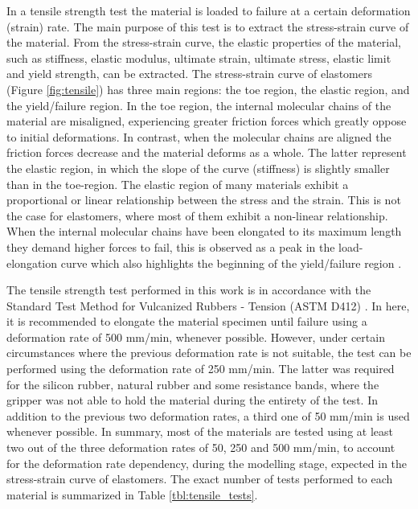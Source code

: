 In a tensile strength test the material is loaded to failure at a certain deformation (strain) rate. The main purpose of this test is to extract the stress-strain curve of the material. From the stress-strain curve, the elastic properties of the material, such as stiffness, elastic modulus, ultimate strain, ultimate stress, elastic limit and yield strength, can be extracted. The stress-strain curve of elastomers (Figure \ref{fig:tensile}) has three main regions: the toe region, the elastic region, and the yield/failure region. In the toe region, the internal molecular chains of the material are misaligned, experiencing greater friction forces which greatly oppose to initial deformations. In contrast, when the molecular chains are aligned the friction forces decrease and the material deforms as a whole. The latter represent the elastic region, in which the slope of the curve (stiffness) is slightly smaller than in the toe-region. The elastic region of many materials exhibit a proportional or linear relationship between the stress and the strain. This is not the case for elastomers, where most of them exhibit a non-linear relationship. When the internal molecular chains have been elongated to its maximum length they demand higher forces to fail, this is observed as a peak in the load-elongation curve which also highlights the beginning of the yield/failure region \cite{Bauman2008}.

The tensile strength test performed in this work is in accordance with the Standard Test Method for Vulcanized Rubbers - Tension (ASTM D412) \cite{astmd412}. In here, it is recommended to elongate the material specimen until failure using a deformation rate of 500 mm/min, whenever possible. However, under certain circumstances where the previous deformation rate is not suitable, the test can be performed using the deformation rate of 250 mm/min. The latter was required for the silicon rubber, natural rubber and some resistance bands, where the gripper was not able to hold the material during the entirety of the test. In addition to the previous two deformation rates, a third one of 50 mm/min is used whenever possible. In summary, most of the materials are tested using at least two out of the three deformation rates of 50, 250 and 500 mm/min, to account for the deformation rate dependency, during the modelling stage, expected in the stress-strain curve of elastomers. The exact number of tests performed to each material is summarized in Table \ref{tbl:tensile_tests}.

